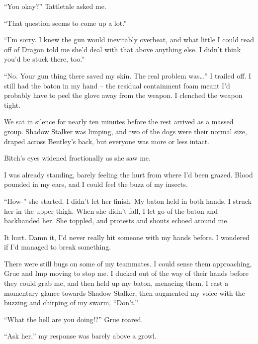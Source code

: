 ``You okay?'' Tattletale asked me.



``That question seems to come up a lot.''



``I'm sorry.  I knew the gun would inevitably overheat, and what little I could read off of Dragon told me she'd deal with that above anything else.  I didn't think you'd be stuck there, too.''



``No.  Your gun thing there saved my skin.  The real problem was\ldots'' I trailed off.  I still had the baton in my hand – the residual containment foam meant I'd probably have to peel the glove away from the weapon.  I clenched the weapon tight.



We sat in silence for nearly ten minutes before the rest arrived as a massed group.  Shadow Stalker was limping, and two of the dogs were their normal size, draped across Bentley's back, but everyone was more or less intact.



Bitch's eyes widened fractionally as she saw me.



I was already standing, barely feeling the hurt from where I'd been grazed.  Blood pounded in my ears, and I could feel the buzz of my insects.



``How-'' she started.  I didn't let her finish.  My baton held in both hands, I struck her in the upper thigh.  When she didn't fall, I let go of the baton and backhanded her.  She toppled, and protests and shouts echoed around me.



It hurt.  Damn it, I'd never really hit someone with my hands before.  I wondered if I'd managed to break something.



There were still bugs on some of my teammates.  I could sense them approaching, Grue and Imp moving to stop me.  I ducked out of the way of their hands before they could grab me, and then held up my baton, menacing them.  I cast a momentary glance towards Shadow Stalker, then augmented my voice with the buzzing and chirping of my swarm, ``Don't.''



``What the hell are you doing!?'' Grue roared.



``Ask her,'' my response was barely above a growl.



